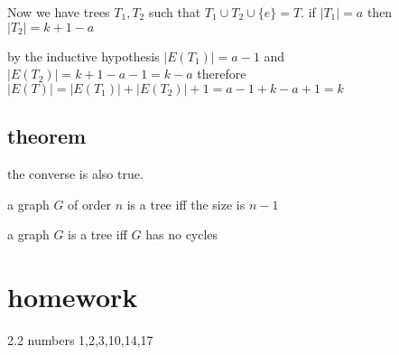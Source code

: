 \documentclass[letterpaper]{article}
\begin{document}
Now we have trees $T_1,T_2$ such that $T_1\cup T_2\cup \{e\}=T$. if $|T_1|=a$ then $|T_2|=k+1-a$

by the inductive hypothesis $|E(T_1)|=a-1$ and $|E(T_2)|=k+1-a-1=k-a$ therefore $|E(T)|=|E(T_1)|+|E(T_2)|+1=a-1+k-a+1=k$

\subsection*{theorem}
the converse is also true.

a graph $G$ of order $n$ is a tree iff the size is $n-1$

a graph $G$ is a tree iff $G$ has no cycles

\section*{homework}
2.2 numbers 1,2,3,10,14,17
\end{document}
